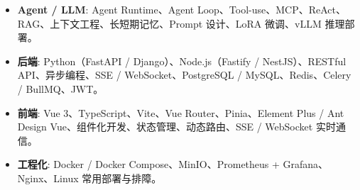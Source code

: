 \documentclass[zh]{resume}
\begin{document}
\begin{itemize}
  \item \textbf{Agent / LLM}: Agent Runtime、Agent Loop、Tool-use、MCP、ReAct、RAG、上下文工程、长短期记忆、Prompt 设计、LoRA 微调、vLLM 推理部署。
  \item \textbf{后端}: Python（FastAPI / Django）、Node.js（Fastify / NestJS）、RESTful API、异步编程、SSE / WebSocket、PostgreSQL / MySQL、Redis、Celery / BullMQ、JWT。
  \item \textbf{前端}: Vue 3、TypeScript、Vite、Vue Router、Pinia、Element Plus / Ant Design Vue、组件化开发、状态管理、动态路由、SSE / WebSocket 实时通信。
  \item \textbf{工程化}: Docker / Docker Compose、MinIO、Prometheus + Grafana、Nginx、Linux 常用部署与排障。
\end{itemize}
\end{document}
